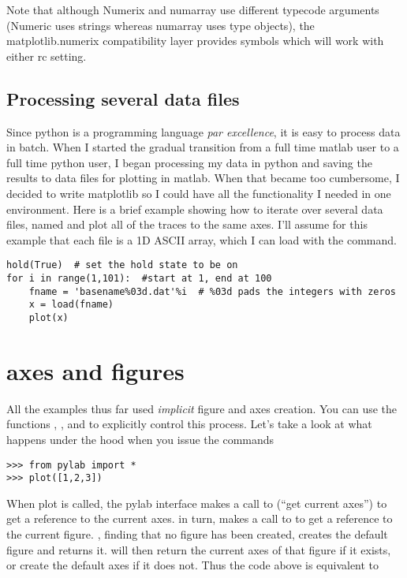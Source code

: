 \documentclass[twoside]{book}
\begin{document}


\noindent Note that although Numerix and numarray use different
typecode arguments (Numeric uses strings whereas numarray uses type
objects), the matplotlib.numerix compatibility layer provides symbols
which will work with either  rc setting.

\subsection{Processing several data files}
\label{sec:multiple_files}

Since python is a programming language \textit{par excellence}, it is
easy to process data in batch.  When I started the gradual transition
from a full time matlab user to a full time python user, I began
processing my data in python and saving the results to data files for
plotting in matlab.  When that became too cumbersome, I decided to
write matplotlib so I could have all the functionality I needed in one
environment.  Here is a brief example showing how to iterate over
several data files, named  and plot all of the traces to
the same axes.  I'll assume for this example that each file is a 1D
ASCII array, which I can load with the  command.

\begin{lstlisting}
hold(True)  # set the hold state to be on
for i in range(1,101):  #start at 1, end at 100
    fname = 'basename%03d.dat'%i  # %03d pads the integers with zeros
    x = load(fname)
    plot(x)
\end{lstlisting}


\section{axes and figures}
\label{sec:axes_and_figures}
All the examples thus far used \textit{implicit} figure and axes
creation.  You can use the functions , ,
and  to explicitly control this process.  Let's take a look
at what happens under the hood when you issue the commands

\begin{lstlisting}
>>> from pylab import *
>>> plot([1,2,3])
\end{lstlisting}

When plot is called, the pylab interface makes a call to 
(``get current axes'') to get a reference to the current axes.
 in turn, makes a call to  to get a reference to
the current figure.  , finding that no figure has been
created, creates the default figure  and returns it.
 will then return the current axes of that figure if it
exists, or create the default axes  if it does
not.  Thus the code above is equivalent to 
\end{document}
